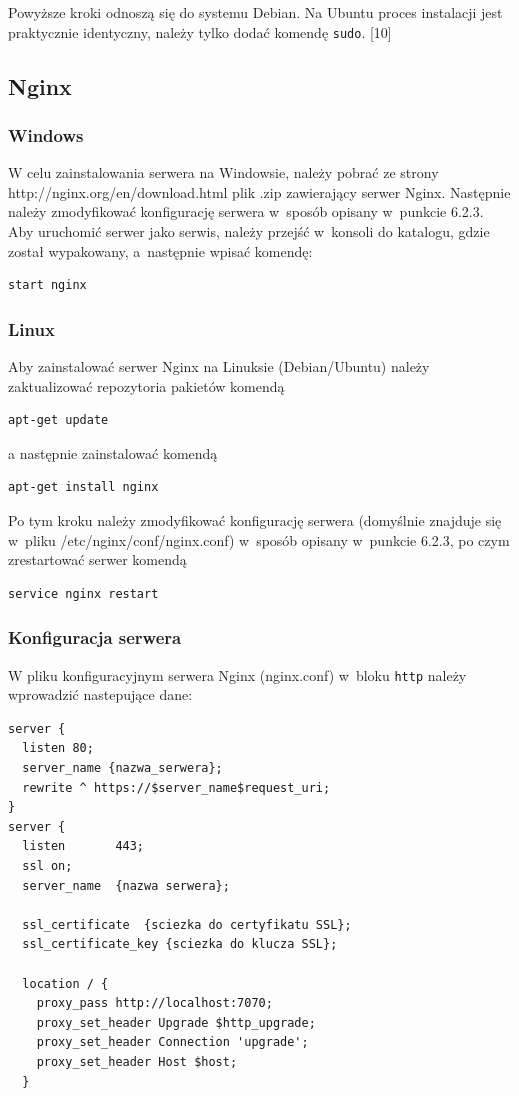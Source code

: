 \documentclass[12pt,a4paper,notitlepage]{article}
\begin{document}
Powyższe kroki odnoszą się do systemu Debian. Na Ubuntu proces instalacji jest praktycznie identyczny, należy tylko dodać komendę \texttt{sudo}. [10]

\subsection{Nginx}
\subsubsection{Windows}
W celu zainstalowania serwera na Windowsie, należy pobrać ze strony \\ http://nginx.org/en/download.html plik .zip zawierający serwer Nginx. Następnie należy zmodyfikować konfigurację serwera w~sposób opisany w~punkcie 6.2.3. Aby uruchomić serwer jako serwis, należy przejść w~konsoli do katalogu, gdzie został wypakowany, a~następnie wpisać komendę:
\begin{lstlisting}
start nginx
\end{lstlisting}

\subsubsection{Linux}
Aby zainstalować serwer Nginx na Linuksie (Debian/Ubuntu) należy zaktualizować repozytoria pakietów komendą
\begin{lstlisting}
apt-get update
\end{lstlisting}
a następnie zainstalować komendą
\begin{lstlisting}
apt-get install nginx
\end{lstlisting}
Po tym kroku należy zmodyfikować konfigurację serwera (domyślnie znajduje się w~pliku /etc/nginx/conf/nginx.conf) w~sposób opisany w~punkcie 6.2.3, po czym zrestartować serwer komendą
\begin{lstlisting}
service nginx restart
\end{lstlisting}

\subsubsection{Konfiguracja serwera}
W pliku konfiguracyjnym serwera Nginx (nginx.conf) w~bloku \texttt{http} należy wprowadzić nastepujące dane:
\begin{lstlisting}
server {
  listen 80;
  server_name {nazwa_serwera};
  rewrite ^ https://$server_name$request_uri;
}
server {
  listen       443;
  ssl on;
  server_name  {nazwa serwera};

  ssl_certificate  {sciezka do certyfikatu SSL};
  ssl_certificate_key {sciezka do klucza SSL};

  location / {
    proxy_pass http://localhost:7070;
    proxy_set_header Upgrade $http_upgrade;
    proxy_set_header Connection 'upgrade';
    proxy_set_header Host $host;
  }
\end{lstlisting}
\end{document}
